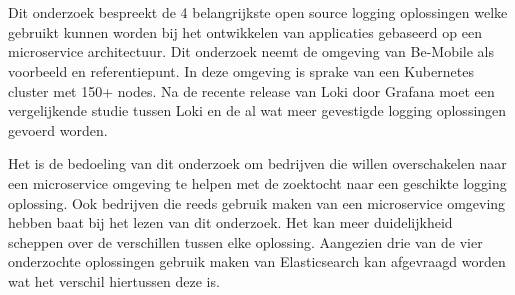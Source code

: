 
%
%




\chapter*{}

Dit onderzoek bespreekt de 4 belangrijkste open source logging oplossingen welke gebruikt kunnen worden bij het ontwikkelen van applicaties gebaseerd op een microservice architectuur. Dit onderzoek neemt de omgeving van Be-Mobile als voorbeeld en referentiepunt. In deze omgeving is sprake van een Kubernetes cluster met 150+ nodes. Na de recente release van Loki door Grafana moet een vergelijkende studie tussen Loki en de al wat meer gevestigde logging oplossingen gevoerd worden. 

Het is de bedoeling van dit onderzoek om bedrijven die willen overschakelen naar een microservice omgeving te helpen met de zoektocht naar een geschikte logging oplossing. Ook bedrijven die reeds gebruik maken van een microservice omgeving hebben baat bij het lezen van dit onderzoek. Het kan meer duidelijkheid scheppen over de verschillen tussen elke oplossing. Aangezien drie van de vier onderzochte oplossingen gebruik maken van Elasticsearch kan afgevraagd worden wat het verschil hiertussen deze is.

